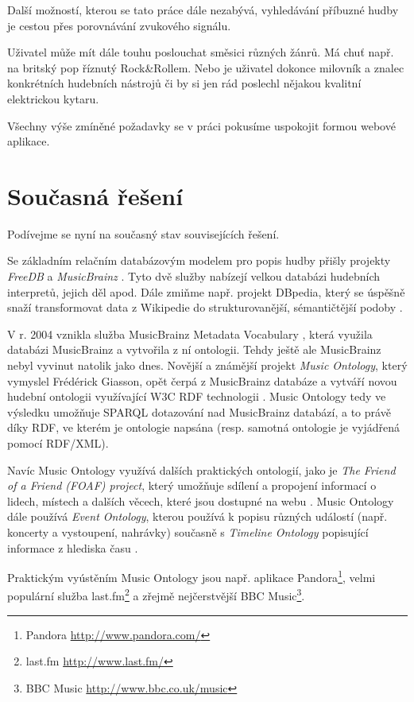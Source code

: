 Další možností, kterou se tato práce dále nezabývá, vyhledávání příbuzné hudby je cestou přes porovnávání zvukového signálu.

Uživatel může mít dále touhu poslouchat směsici různých žánrů. Má chuť např. na britský pop říznutý Rock\&Rollem.
Nebo je uživatel dokonce milovník a znalec konkrétních hudebních nástrojů či by si jen rád poslechl nějakou kvalitní elektrickou kytaru.

Všechny výše zmíněné požadavky se v práci pokusíme uspokojit formou webové aplikace.

\section{Současná řešení}

    Podívejme se nyní na současný stav souvisejících řešení.
    
    Se základním relačním databázovým modelem pro popis hudby přišly projekty \textit{FreeDB} \cite{freedb} a \textit{MusicBrainz} \cite{musicbrainz}.
    Tyto dvě služby nabízejí velkou databázi hudebních interpretů, jejich děl apod. Dále zmiňme např. projekt DBpedia, který se úspěšně snaží transformovat data z Wikipedie do strukturovanější, sémantičtější podoby \cite{dbpedia}. 
    
    V r. 2004 vznikla služba MusicBrainz Metadata Vocabulary \cite{musicbrainzmetadatavoc}, která využila databázi MusicBrainz a vytvořila z ní ontologii. Tehdy ještě ale MusicBrainz nebyl vyvinut natolik jako dnes.
    Novější a známější projekt \textit{Music Ontology}, který vymyslel Frédérick Giasson, opět čerpá z MusicBrainz databáze a vytváří novou hudební ontologii využívající W3C RDF technologii \cite{mo}. 
    Music Ontology tedy ve výsledku umožňuje SPARQL dotazování nad MusicBrainz databází, a to právě díky RDF, ve kterém je ontologie napsána (resp. samotná ontologie je vyjádřená pomocí RDF/XML).
    
    Navíc Music Ontology využívá dalších praktických ontologií, jako je \textit{The Friend of a Friend (FOAF) project}, který umožňuje sdílení a propojení informací o lidech, místech a dalších věcech, které jsou dostupné na webu \cite{foaf}.
    Music Ontology dále používá \textit{Event Ontology}, kterou používá k popisu různých událostí (např. koncerty a vystoupení, nahrávky) \cite{event} současně s \textit{Timeline Ontology} popisující informace z hlediska času \cite{timeline}.

    Praktickým vyústěním Music Ontology jsou např. aplikace Pandora\footnote{Pandora \url{http://www.pandora.com/}}, velmi populární služba last.fm\footnote{last.fm \url{http://www.last.fm/}} a zřejmě nejčerstvější BBC Music\footnote{BBC Music \url{http://www.bbc.co.uk/music}}.

